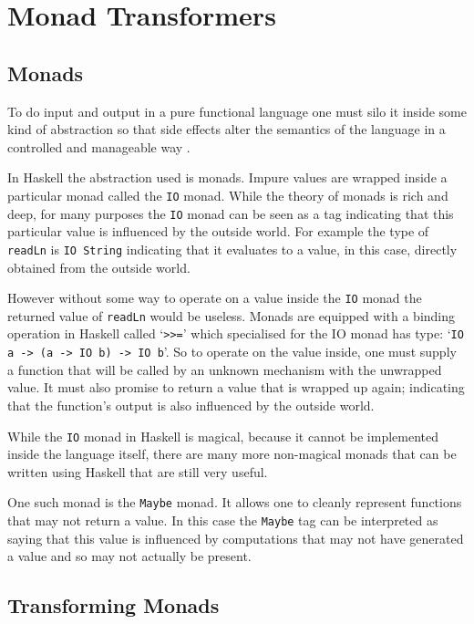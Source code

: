 \documentclass[]{article}
\newcommand{\function}[1]{\texttt{#1}}
\newcommand{\type}[1]{\texttt{#1}}
\begin{document}


\section{Monad Transformers}
\subsection{Monads}
To do input and output in a pure functional language one must silo it inside
some kind of abstraction so that side effects alter the semantics of the
language in a controlled and manageable way \cite{PeytonJones:2001}.

In Haskell the abstraction used is monads. Impure values are wrapped inside a
particular monad called the \type{IO} monad. While the theory of monads is
rich and deep, for many purposes the \type{IO} monad can be seen as a tag
indicating that this particular value is influenced by the outside world. For
example the type of \function{readLn} is \type{IO String} indicating that it
evaluates to a value, in this case, directly obtained from the outside world.

However without some way to operate on a value inside the \type{IO} monad the
returned value of \function{readLn} would be useless. Monads are equipped with
a binding operation in Haskell called `\function{>>=}' which specialised for
the IO monad has type: `\type{IO a -> (a -> IO b) -> IO b}'. So to operate on
the value inside, one must supply a function that will be called by an unknown
mechanism with the unwrapped value. It must also promise to return a value
that is wrapped up again; indicating that the function's output is also
influenced by the outside world.

While the \type{IO} monad in Haskell is magical, because it cannot
be implemented inside the language itself, there are many
more non-magical monads that can be written using Haskell that are
still very useful.

One such monad is the \type{Maybe} monad. It allows one to cleanly represent
functions that may not return a value. In this case the \type{Maybe} tag can
be interpreted as saying that this value is influenced by computations that
may not have generated a value and so may not actually be present.

\subsection{Transforming Monads}
\label{discussion:monadtrans}
\end{document}
